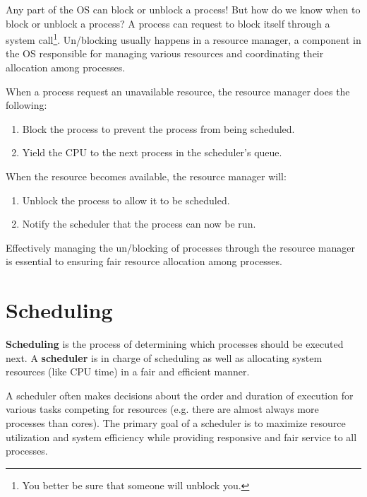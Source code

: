 \documentclass{report}
\newcommand{\definitionBegin}[1]{\begin{tcolorbox}[title={Definition: #1}]}
\newcommand{\definitionEnd}{\end{tcolorbox}}
\newcommand{\exampleBegin}[1]{\begin{tcolorbox}[colback=blue!5!white,colframe=black!75!blue,title={Example:
      #1}]}
\newcommand{\exampleEnd}{\end{tcolorbox}}
\begin{document}
Any part of the OS can block or unblock a process! But how do we know when to block or unblock a process? A
process can request to block itself through a system call\footnote{You better be sure that someone
  will unblock you.}. Un/blocking usually happens in a resource manager, a component in the OS
responsible for managing various resources and coordinating their allocation among processes.

\exampleBegin{Resource Management}
When a process request an unavailable resource, the resource manager does the following:

\begin{enumerate}[label=\textit{(\roman*)}]
\item Block the process to prevent the process from being scheduled.
\item Yield the CPU to the next process in the scheduler's queue.
\end{enumerate}
When the resource becomes available, the resource manager will:

\begin{enumerate}[label=\textit{(\roman*)}]
\item Unblock the process to allow it to be scheduled.
\item Notify the scheduler that the process can now be run.
\end{enumerate}
\exampleEnd

Effectively managing the un/blocking of processes through the resource manager is essential to
ensuring fair resource allocation among processes.










\chapter{Scheduling}
\definitionBegin{Scheduling/Scheduler}
\textbf{Scheduling} is the process of determining which processes should be executed next.
\tcblower
A \textbf{scheduler} is in charge of scheduling as well as allocating system resources (like CPU
time) in a fair and efficient manner.
\definitionEnd

A scheduler often makes decisions about the order and duration of execution for various tasks
competing for resources (e.g. there are almost always more processes than cores). The primary goal
of a scheduler is to maximize resource utilization and system efficiency while providing responsive
and fair service to all processes.
\end{document}
